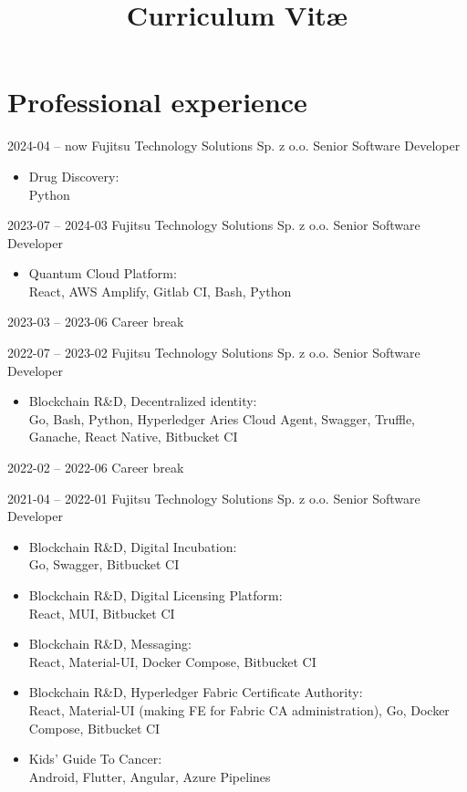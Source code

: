 \documentclass[11pt,a4paper,sans,english]{moderncv}   %
\title{Curriculum Vit\ae{}}
\begin{document}
\makecvtitle

\vspace{-1.6cm}

\section{Professional experience}

\cventry
{\small2024-04 -- now}
	{Fujitsu Technology Solutions Sp. z o.o.}{}{}
	{Senior Software Developer}
	{\begin{itemize}
		\item Drug Discovery: \\
			Python
	\end{itemize}}

\cventry
{\small2023-07 -- 2024-03}
	{Fujitsu Technology Solutions Sp. z o.o.}{}{}
	{Senior Software Developer}
	{\begin{itemize}
		\item Quantum Cloud Platform: \\
			React, AWS Amplify, Gitlab CI, Bash, Python
	\end{itemize}}

\cventry
{\small2023-03 -- 2023-06}
	{Career break}{}{}{}{}

\cventry
{\small2022-07 -- 2023-02}
	{Fujitsu Technology Solutions Sp. z o.o.}{}{}
	{Senior Software Developer}
	{\begin{itemize}
		\item Blockchain R\&D, Decentralized identity: \\
			 Go, Bash, Python, Hyperledger Aries Cloud Agent, Swagger, Truffle,
			 Ganache, React Native, Bitbucket CI
	\end{itemize}}

\cventry
{\small2022-02 -- 2022-06}
	{Career break}{}{}{}{}

\cventry
{\small2021-04 -- 2022-01}
	{Fujitsu Technology Solutions Sp. z o.o.}{}{}
	{Senior Software Developer}
	{\begin{itemize}
		\item Blockchain R\&D, Digital Incubation: \\
			Go, Swagger, Bitbucket CI
		\item Blockchain R\&D, Digital Licensing Platform: \\
			React, MUI, Bitbucket CI
		\item Blockchain R\&D, Messaging: \\
			React, Material-UI, Docker Compose, Bitbucket CI
		\item Blockchain R\&D, Hyperledger Fabric Certificate Authority: \\
			React, Material-UI (making FE for Fabric CA administration), Go,
			Docker Compose, Bitbucket CI
		\item Kids' Guide To Cancer: \\
			Android, Flutter, Angular, Azure Pipelines
	\end{itemize}}
\end{document}
